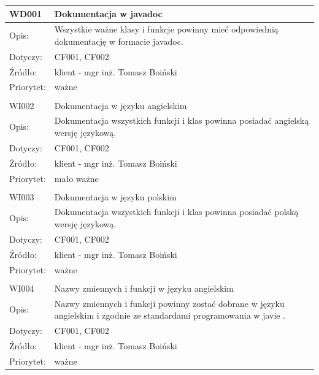 \documentclass[a4paper,10pt]{article}
\begin{document}
\begin{center}

\begin{tabular}{|m{3cm}|m{9cm}|} \hline

WD001 & Dokumentacja w javadoc \\ \hline
Opis: & Wszystkie ważne klasy i funkcje powinny mieć odpowiednią dokumentację w formacie javadoc.\\ \hline
Dotyczy: & CF001, CF002 \\ \hline
Źródło: & klient - mgr inż. Tomasz Boiński \\ \hline
Priorytet: & ważne \\ \hline

\multicolumn{2}{c}{} \\
 \hline

WI002 & Dokumentacja w języku angielskim \\ \hline
Opis: & Dokumentacja wszystkich funkcji i klas powinna posiadać angielską wersję językową.\\ \hline
Dotyczy: & CF001, CF002 \\ \hline
Źródło: & klient - mgr inż. Tomasz Boiński \\ \hline
Priorytet: & mało ważne \\ \hline

\multicolumn{2}{c}{} \\
 \hline

WI003 & Dokumentacja w języku polskim \\ \hline
Opis: & Dokumentacja wszystkich funkcji i klas powinna posiadać polską wersję językową. \\ \hline
Dotyczy: & CF001, CF002 \\ \hline
Źródło: & klient - mgr inż. Tomasz Boiński \\ \hline
Priorytet: & ważne \\ \hline

\multicolumn{2}{c}{} \\
 \hline
WI004 & Nazwy zmiennych i funkcji w języku angielskim \\ \hline
Opis: & Nazwy zmiennych i funkcji powinny zostać dobrane w języku angielskim i zgodnie ze standardami programowania w javie \cite{standardJava}.\\ \hline
Dotyczy: & CF001, CF002 \\ \hline
Źródło: & klient - mgr inż. Tomasz Boiński \\ \hline
Priorytet: & ważne \\ \hline

\end{tabular}
 
\end{center}
 
\end{document}
